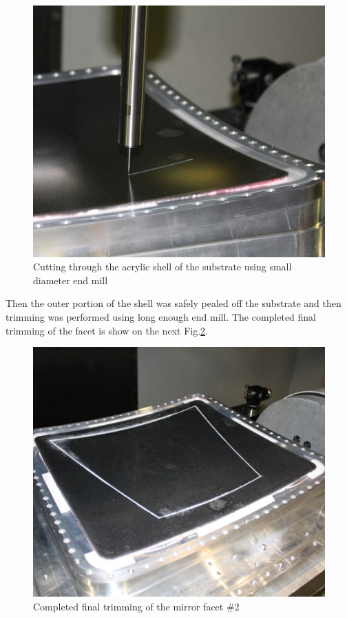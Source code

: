 \begin{figure}[ht]
    \centering
    \includegraphics[width=1.0\linewidth]{images/Trimming_1}
    \caption{Cutting through the acrylic shell of the substrate using small diameter end mill}
    \label{fig:Trimming_1}
\end{figure}

Then the outer portion of the shell was safely pealed off the substrate and then trimming was performed using long enough end mill. The completed final trimming of the facet is show on the next Fig.\ref{fig:Trimming_2}.

\begin{figure}[ht]
    \centering
    \includegraphics[width=1.0\linewidth]{images/Trimming_2}
    \caption{Completed final trimming of the mirror facet \#2}
    \label{fig:Trimming_2}
\end{figure}

